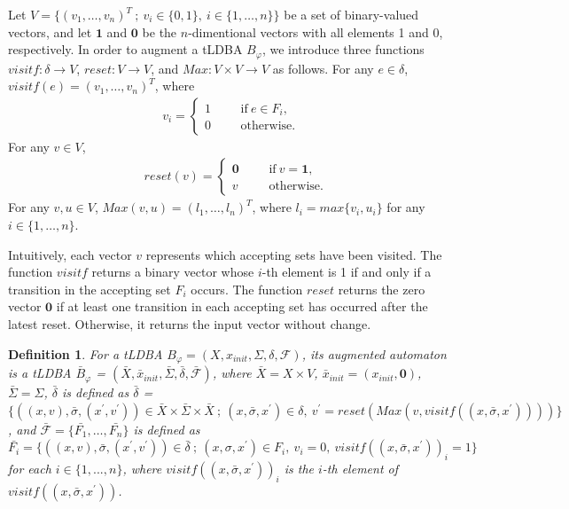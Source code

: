 \documentclass[letterpaper, 10 pt, conference]{ieeeconf}  %
\newtheorem{definition}{Definition}
\begin{document}
Let $V = \{ (v_1, \ldots ,v_n)^T\ ;\ v_i \in \{ 0,1 \},\ i \in \{ 1, \ldots ,n \} \}$ be a set of binary-valued vectors, and let $\bm{1}$ and $\bm{0}$ be the $n$-dimentional vectors with all elements 1 and 0, respectively.
In order to augment a tLDBA $B_{\varphi}$, we introduce three functions $visitf:\delta \rightarrow V$, $reset:V \rightarrow V$, and $Max:V\times V \rightarrow V$ as follows.
For any $e \in \delta$, $visitf(e) = (v_1, \ldots ,v_n)^T$, where %
\begin{align}
 v_i =
  \left\{
  \begin{aligned}
    1 &   & &\text{if}\ e\in F_i, \\
    0 &   & &\text{otherwise}.
  \end{aligned}
  \right. \nonumber
\end{align}
For any $v \in V$, %
\begin{align}
  &reset(v) =
  \left\{
  \begin{aligned}
    \bm{0} &   & &\text{if}\  v = \bm{1},\\
    v &   & &\text{otherwise}.
  \end{aligned}
  \right. \nonumber
\end{align}
For any $v,u \in V$, $Max(v,u) = (l_1,\ldots ,l_n)^T$, where $l_i = max\{v_i, u_i\} $ for any $i\in \{1, \ldots ,n\}$.

Intuitively, each vector $v$ represents which accepting sets have been visited. The function $visitf$ returns a binary vector whose $i$-th element is 1 if and only if a transition in the accepting set $F_i$ occurs. The function $reset$ returns the zero vector $\bm{0}$ if at least one transition in each accepting set has occurred after the latest reset. Otherwise, it returns the input vector without change.

\begin{definition}
   For a tLDBA $B_{\varphi} = (X,x_{init},\Sigma,\delta,\mathcal{F})$, its augmented automaton is a tLDBA $\bar{B}_{\varphi}$ = $(\bar{X},\bar{x}_{init},\bar{\Sigma},\bar{\delta},\bar{\mathcal{F}})$, where $\bar{X} = X\times V$, $\bar{x}_{init} = (x_{init}, \bm{0})$, $\bar{\Sigma} = \Sigma$, $\bar{\delta}$ is defined as $\bar{\delta}$ = $\{ ((x,v), \bar{\sigma}, (x^{\prime},v^{\prime})) \in \bar{X} \times \bar{\Sigma} \times \bar{X}\ ;\ (x,\bar{\sigma},x^{\prime}) \in \delta,\ v^{\prime} = reset(Max(v,visitf((x,\bar{\sigma},x^{\prime})))) \}$, and $\mathcal{\bar{F}} = \{ \bar{F_1}, \ldots ,\bar{F_n} \}$ is defined as $\bar{F_i} = \{ ((x,v), \bar{\sigma}, (x^{\prime},v^{\prime})) \in \bar{\delta}\ ;\ (x, \sigma, x^{\prime}) \in F_i,\ v_i = 0,\ visitf((x, \bar{\sigma}, x^{\prime}))_i = 1\}$ for each $ i \in \{1,...,n\}$, where $visitf((x, \bar{\sigma}, x^{\prime}))_i$ is the $i$-th element of $visitf((x, \bar{\sigma}, x^{\prime}))$.
\end{definition}
\end{document}
